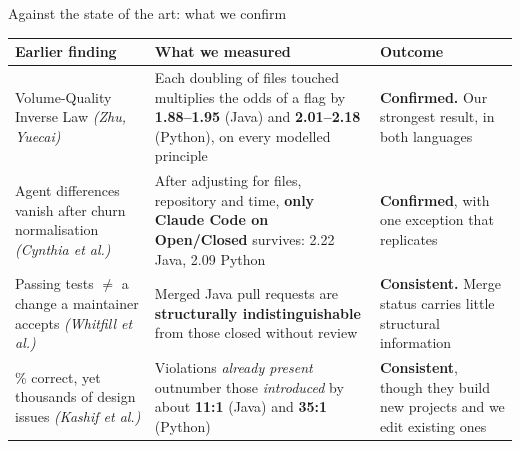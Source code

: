 \documentclass[11pt,aspectratio=169]{beamer}
\begin{document}
\begin{frame}{Against the state of the art: what we confirm}
\scriptsize
\begin{tabular}{@{}L{3.1cm}L{4.5cm}L{3.9cm}@{}}
\toprule
\textbf{Earlier finding} & \textbf{What we measured} & \textbf{Outcome} \\
\midrule
Volume-Quality Inverse Law \textit{(Zhu, Yuecai)} &
Each doubling of files touched multiplies the odds of a flag by \textbf{1.88--1.95} (Java) and
\textbf{2.01--2.18} (Python), on every modelled principle &
\textcolor{goodgreen}{\textbf{Confirmed.}} Our strongest result, in both languages \\
\addlinespace
Agent differences vanish after churn normalisation \textit{(Cynthia et al.)} &
After adjusting for files, repository and time, \textbf{only Claude Code on Open/Closed} survives:
2.22 Java, 2.09 Python &
\textcolor{goodgreen}{\textbf{Confirmed}}, with one exception that replicates \\
\addlinespace
Passing tests $\neq$ a change a maintainer accepts \textit{(Whitfill et al.)} &
Merged Java pull requests are \textbf{structurally indistinguishable} from those closed without
review &
\textcolor{goodgreen}{\textbf{Consistent.}} Merge status carries little structural information \\
\% correct, yet thousands of design issues \textit{(Kashif et al.)} &
Violations \emph{already present} outnumber those \emph{introduced} by about \textbf{11:1} (Java)
and \textbf{35:1} (Python) &
\textcolor{goodgreen}{\textbf{Consistent}}, though they build new projects and we edit existing
ones \\
\bottomrule
\end{tabular}
\end{frame}
\end{document}
